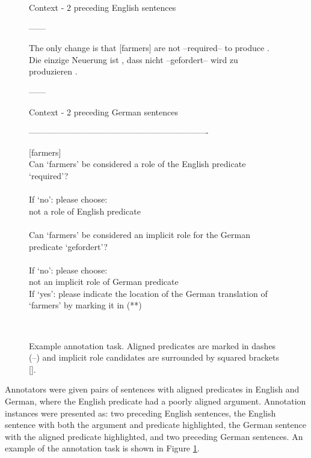 \documentclass[11pt]{article}
\begin{document}
\begin{figure}[t!]
	\begin{mdframed}
		\small{Context - 2 preceding English sentences \
			\begin{center}
				------
			\end{center}
			The only change is that [farmers] are not --required-- to produce . \\
			Die einzige Neuerung ist , dass nicht --gefordert-- wird zu produzieren . \
			\begin{center}
				------
			\end{center}
			Context - 2 preceding German sentences
			
			\begin{center}
			----------------------------------------------------------------
			\end{center}
			
			[farmers]\\
			Can `farmers' be considered a role of the English predicate `required'?\\ \\
			If `no': please choose:\\
			not a role of English predicate\\\\
			Can `farmers' be considered an implicit role for the German predicate `gefordert'?\\\\
			If `no': please choose:\\
			not an implicit role of German predicate  \\
			If `yes': please indicate the location of the German translation of `farmers' by marking it in (**)}\\
		
	\end{mdframed}
	\caption{Example annotation task. Aligned predicates are marked in dashes (--) and implicit role candidates are surrounded by squared brackets [].}\label{annotask}
	
\end{figure}


Annotators were given pairs of sentences with aligned predicates in English and German, where the English predicate had a poorly aligned argument. Annotation instances were presented as: two preceding English sentences, the English sentence with both the argument and predicate highlighted, the German sentence with the aligned predicate highlighted, and two preceding German sentences. An example of the annotation task is shown in Figure \ref{annotask}.
\end{document}
